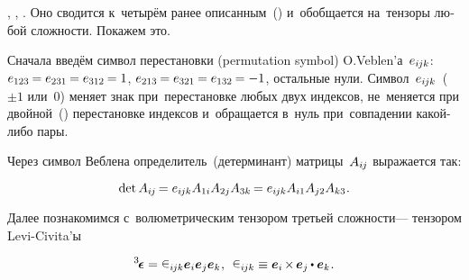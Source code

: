 \begin{otherlanguage}{russian}

,   , .
Оно сводится к~четырём ранее описанным~() и~обобщается на~тензоры любой сложности. Покажем это.

Сначала введём символ перестановки (permutation symbol) \hbox{O.\hspace{0.1ex}Veblen’а}~${e_{i\hspace{-0.1ex}jk}}$: ${e_{123} \hspace{-0.15ex}= e_{231} \hspace{-0.15ex}= e_{312} \hspace{-0.15ex}= 1}$, ${e_{213} \hspace{-0.15ex}= e_{321} \hspace{-0.15ex}= e_{132} \hspace{-0.15ex}= -1}$, остальные нули. Символ~${e_{i\hspace{-0.1ex}jk}}$~(${\pm 1}$ или~$0$) меняет знак при~перестановке любых двух индексов, не~меняется при двойной~() перестановке индексов и~обращается в~нуль при~совпадении какой\hbox{-}либо пары.

Через символ Веблена определитель~(детерминант) матрицы~${A_{i\hspace{-0.1ex}j}}$ выражается так:

\nopagebreak\vspace{-0.25em}\begin{equation*}
\operatorname{det} A_{i\hspace{-0.1ex}j} \hspace{-0.2ex} = e_{i\hspace{-0.1ex}jk} A_{1i} A_{2j} A_{3k} \hspace{-0.2ex} = e_{i\hspace{-0.1ex}jk} A_{i1} A_{j2} A_{k3} \hspace{.1ex} .
\end{equation*}

Далее познакомимся с~волюметрическим тензором третьей сложности\:--- тензором Levi\hbox{-}Civita\hspace{-0.1ex}’ы

\nopagebreak\vspace{-0.15em}\begin{equation}\label{levicivitaintro}
\levicivitatensor = \levicivita_{i\hspace{-0.1ex}jk} \bm{e}_i \bm{e}_j \bm{e}_k \hspace{0.1ex}, \:\:
\levicivita_{i\hspace{-0.1ex}jk} \equiv \bm{e}_i \hspace{-0.2ex} \times \hspace{-0.2ex} \bm{e}_j \hspace{-0.1ex} \dotp \bm{e}_k \hspace{.1ex} .
\end{equation}


\end{otherlanguage}
